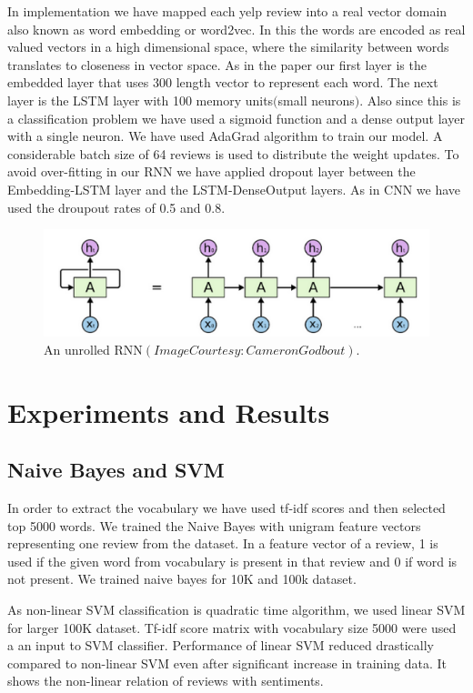 \documentclass[11pt]{article}
\begin{document}
		In implementation we have mapped each yelp review into a real vector domain also known as word embedding or word2vec. In this the words are encoded as real valued vectors in a high dimensional space, where the similarity between words translates to closeness in vector space. As in the paper our first layer is the embedded layer that uses 300 length vector to represent each word. The next layer is the LSTM layer with 100 memory units$($small neurons$)$. Also since this is a classification problem we have used a sigmoid function and a dense output layer with a single neuron. We have used AdaGrad algorithm to train our model. A considerable batch size of 64 reviews is used to distribute the weight updates. To avoid over-fitting in our RNN we have applied dropout layer between the Embedding-LSTM layer and the LSTM-DenseOutput layers. As in CNN we have used the droupout rates of 0.5 and 0.8.
		
		
		\begin{figure}
			\includegraphics[width=\linewidth]{Rnn.png}
			\caption{An unrolled RNN$(Image Courtesy:Cameron Godbout)$. }
			\label{fig:rnn}
		\end{figure}
	
	\section{Experiments and Results}
		\subsection{Naive Bayes and SVM}
		In order to extract the vocabulary we have used tf-idf scores and then selected top 5000 words. We trained the Naive Bayes with unigram feature vectors representing one review from the dataset. In a feature vector of a review, 1 is used if the given word from vocabulary is present in that review and 0 if word is not present. We trained naive bayes for 10K and 100k dataset.
		
		As non-linear SVM classification is quadratic time algorithm, we used linear SVM for larger 100K dataset. Tf-idf score matrix with vocabulary size 5000 were used a an input to SVM classifier. Performance of linear SVM reduced drastically compared to non-linear SVM even after significant increase in training data. It shows the non-linear relation of reviews with sentiments.
		
\end{document}
